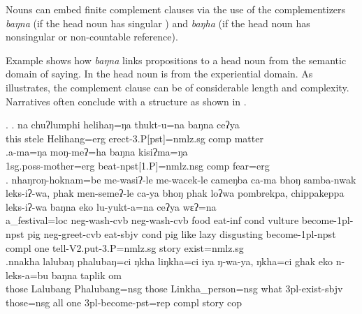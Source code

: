 Nouns can embed finite complement clauses via the use of the complementizers \emph{baŋna} (if the head noun has singular ) and \emph{baŋha} (if the head noun has nonsingular  or non-countable reference). 

Example \Next[a] shows how   \emph{baŋna} links  propositions to a head noun from the semantic domain of saying.  In \Next[b] the head noun is from the experiential domain. As \Next[c] illustrates, the complement clause can be of considerable length and complexity. Narratives often conclude with a structure as shown in \Next[d]. 

\ex. \ag.  na   chuʔlumphi helihaŋ=ŋa  thukt-u=na  baŋna ceʔya\\
this stele Helihang{\sc =erg} erect{\sc -3.P[pst]=nmlz.sg} {\sc comp} matter\\
 
\bg.a-ma=ŋa                moŋ-meʔ=ha                baŋna kisiʔma=ŋa\\
{\sc 1sg.poss-}mother{\sc =erg} beat{\sc -npst[1.P]=nmlz.nsg} {\sc comp} fear{\sc =erg}\\
 
\bg. nhaŋroŋ-hoknam=be    me-wasiʔ-le      me-wacek-le        cameŋba  ca-ma     bhoŋ samba-nwak leks-iʔ-wa,          phak men-semeʔ-le    ca-ya  bhoŋ phak loʔwa pombrekpa,  chippakeppa    leks-iʔ-wa baŋna eko lu-yukt-a=na        ceʔya wɛʔ=na\\
a\_festival{\sc =loc} {\sc neg}-wash{\sc -cvb} {\sc neg}-wash{\sc -cvb} food eat{\sc -inf} {\sc cond} vulture become{\sc -1pl-npst} pig {\sc neg}-greet{\sc -cvb} eat{\sc -sbjv} {\sc cond} pig like lazy disgusting become{\sc -1pl-npst} {\sc compl} one tell{\sc -V2.put-3.P=nmlz.sg} story exist{\sc [3sg]=nmlz.sg}\\
 
\bg.nnakha lalubaŋ phalubaŋ=ci    ŋkha liŋkha=ci      iya            ŋ-wa-ya,        ŋkha=ci ghak eko n-leks-a=bu baŋna taplik om\\
those Lalubang Phalubang{\sc =nsg} those Linkha\_person{\sc =nsg} what {\sc 3pl-}exist{\sc -sbjv} those{\sc =nsg} all one {\sc 3pl-}become{\sc -pst=rep} {\sc compl} story {\sc cop}\\
 

